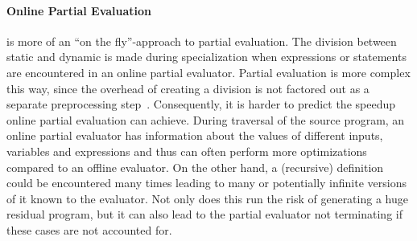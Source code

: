 \paragraph{Online Partial Evaluation}
is more of an \enquote{on the fly}-approach to partial evaluation.
The division between static and dynamic is made during specialization when expressions or statements are encountered in an online partial evaluator.
Partial evaluation is more complex this way, since the overhead of creating a division is not factored out as a separate preprocessing step~\cite{Cook_TutorialOnlinePartialEvaluation}.
Consequently, it is harder to predict the speedup online partial evaluation can achieve.
During traversal of the source program, an online partial evaluator has information about the values of different inputs, variables and expressions and thus can often perform more optimizations compared to an offline evaluator.
On the other hand, a (recursive) definition could be encountered many times leading to many or potentially infinite versions of it known to the evaluator.
Not only does this run the risk of generating a huge residual program, but it can also lead to the partial evaluator not terminating if these cases are not accounted for.



